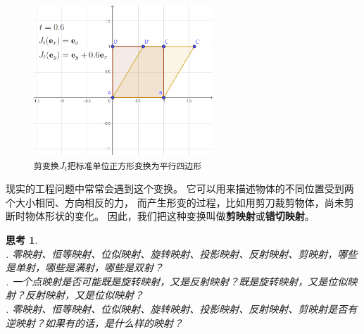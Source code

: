 \documentclass[12pt,UTF8]{ctexbook}
\newtheorem{sk}{思考}[section]
\begin{document}
\begin{figure}[h]
    \vspace{4pt}
    \centering
    \includegraphics[width=0.6\textwidth]{tu/剪变换1.png}
    \captionsetup{justification=centering}
    \caption*{\texttt{剪变换}$J_t$\texttt{把\textcolor[RGB]{162,69,22}{标准单位正方形}变换为\textcolor[RGB]{218,183,74}{平行四边形}}}

\end{figure}

现实的工程问题中常常会遇到这个变换。
它可以用来描述物体的不同位置受到两个大小相同、方向相反的力，
而产生形变的过程，比如用剪刀裁剪物体，尚未剪断时物体形状的变化。
因此，我们把这种变换叫做\textbf{剪映射}或\textbf{错切映射}。


\begin{sk}
    \mbox{} \\
    . 零映射、恒等映射、位似映射、旋转映射、投影映射、反射映射、剪映射，哪些是单射，哪些是满射，哪些是双射？\\
    . 一个点映射是否可能既是旋转映射，又是反射映射？既是旋转映射，又是位似映射？反射映射，又是位似映射？\\
    . 零映射、恒等映射、位似映射、旋转映射、投影映射、反射映射、剪映射是否有逆映射？如果有的话，是什么样的映射？
\end{sk}
\end{document}
